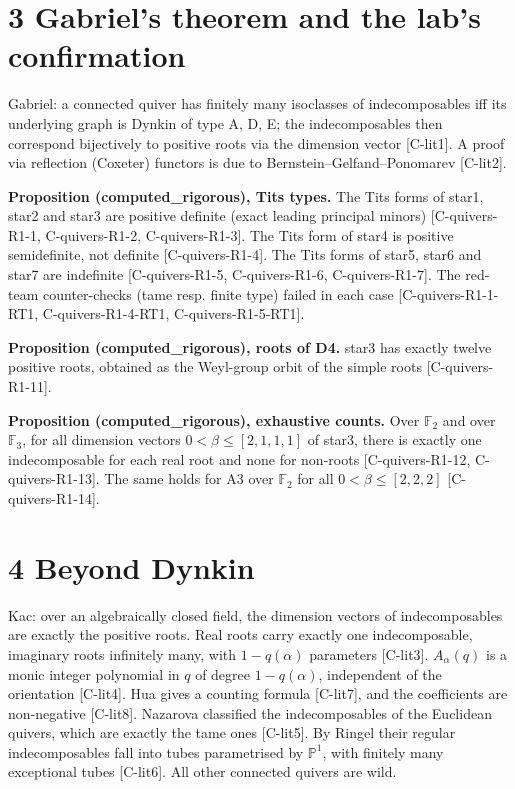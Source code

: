 \documentclass[10pt,twocolumn]{article}
\begin{document}
\section*{3 Gabriel's theorem and the lab's confirmation}

Gabriel: a connected quiver has finitely many isoclasses of indecomposables iff its underlying graph is Dynkin of type A, D, E; the indecomposables then correspond bijectively to positive roots via the dimension vector {\scriptsize[C-lit1]}. A proof via reflection (Coxeter) functors is due to Bernstein–Gelfand–Ponomarev {\scriptsize[C-lit2]}.

\textbf{Proposition (computed\_rigorous), Tits types.} The Tits forms of star1, star2 and star3 are positive definite (exact leading principal minors) {\scriptsize[C-quivers-R1-1, C-quivers-R1-2, C-quivers-R1-3]}. The Tits form of star4 is positive semidefinite, not definite {\scriptsize[C-quivers-R1-4]}. The Tits forms of star5, star6 and star7 are indefinite {\scriptsize[C-quivers-R1-5, C-quivers-R1-6, C-quivers-R1-7]}. The red-team counter-checks (tame resp. finite type) failed in each case {\scriptsize[C-quivers-R1-1-RT1, C-quivers-R1-4-RT1, C-quivers-R1-5-RT1]}.

\textbf{Proposition (computed\_rigorous), roots of D4.} star3 has exactly twelve positive roots, obtained as the Weyl-group orbit of the simple roots {\scriptsize[C-quivers-R1-11]}.

\textbf{Proposition (computed\_rigorous), exhaustive counts.} Over $\mathbb F_2$ and over $\mathbb F_3$, for all dimension vectors $0<\beta\le[2, 1, 1, 1]$ of star3, there is exactly one indecomposable for each real root and none for non-roots {\scriptsize[C-quivers-R1-12, C-quivers-R1-13]}. The same holds for A3 over $\mathbb F_2$ for all $0<\beta\le[2, 2, 2]$ {\scriptsize[C-quivers-R1-14]}.

\section*{4 Beyond Dynkin}

Kac: over an algebraically closed field, the dimension vectors of indecomposables are exactly the positive roots. Real roots carry exactly one indecomposable, imaginary roots infinitely many, with $1-q(\alpha)$ parameters {\scriptsize[C-lit3]}. $A_\alpha(q)$ is a monic integer polynomial in $q$ of degree $1-q(\alpha)$, independent of the orientation {\scriptsize[C-lit4]}. Hua gives a counting formula {\scriptsize[C-lit7]}, and the coefficients are non-negative {\scriptsize[C-lit8]}. Nazarova classified the indecomposables of the Euclidean quivers, which are exactly the tame ones {\scriptsize[C-lit5]}. By Ringel their regular indecomposables fall into tubes parametrised by $\mathbb P^1$, with finitely many exceptional tubes {\scriptsize[C-lit6]}. All other connected quivers are wild.
\end{document}
